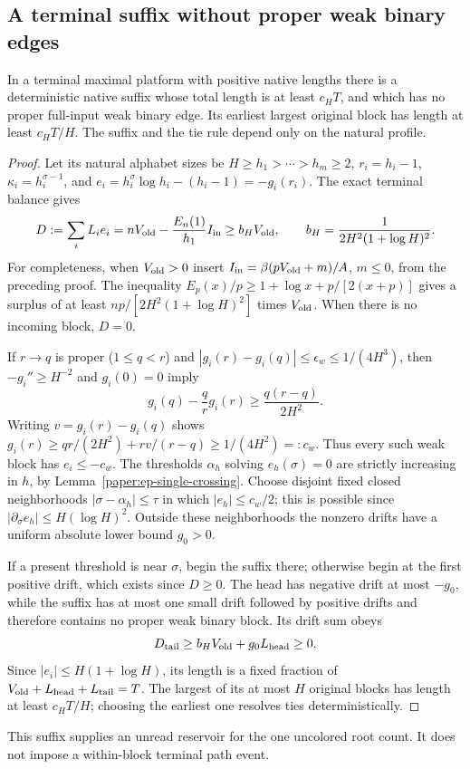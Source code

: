 \subsection{A terminal suffix without proper weak binary edges}
\label{paper:ep-terminal-suffix}
\begin{proposition}\label{paper:ep-binary-free}
In a terminal maximal platform with positive native lengths there is
a deterministic native suffix
whose total length is at least $c_HT$, and which has no proper
full-input weak binary edge.  Its earliest largest original block has
length at least $c_HT/H$.  The suffix and the tie rule depend only on
the natural profile.
\end{proposition}
\begin{proof}
Let its natural alphabet sizes be $H\geq h_1>\cdots>h_m\geq2$,
$r_i=h_i-1$, $\kappa_i=h_i^{\sigma-1}$, and
$e_i=h_i^\sigma\log h_i-(h_i-1)=-g_i(r_i)$.
The exact terminal balance gives
\[
 D:=\sum_iL_ie_i
 =nV_{\rm old}-\frac{E_n(1)}{h_1}I_{\rm in}
 \geq b_HV_{\rm old},\qquad
 b_H=\frac{1}{2H^2(1+\log H)^2}.
\]
For completeness, when $V_{\rm old}>0$ insert
$I_{\rm in}=\beta(pV_{\rm old}+m)/A$, $m\leq0$, from the
preceding proof.  The inequality
$E_p(x)/p\geq1+\log x+p/[2(x+p)]$ gives a surplus of at least
$np/[2H^2(1+\log H)^2]$ times $V_{\rm old}$.
When there is no incoming block, $D=0$.

If $r\to q$ is proper ($1\leq q<r$) and
$|g_i(r)-g_i(q)|\leq\epsilon_w\leq1/(4H^3)$, then
$-g_i''\geq H^{-2}$ and $g_i(0)=0$ imply
\[
 g_i(q)-\frac qrg_i(r)\geq\frac{q(r-q)}{2H^2}.
\]
Writing $v=g_i(r)-g_i(q)$ shows
$g_i(r)\geq qr/(2H^2)+rv/(r-q)\geq1/(4H^2)=:c_w$.
Thus every such weak block has $e_i\leq-c_w$.
The thresholds $\alpha_h$ solving $e_h(\sigma)=0$ are strictly
increasing in $h$, by Lemma~\ref{paper:ep-single-crossing}.
Choose disjoint fixed closed neighborhoods
$|\sigma-\alpha_h|\leq\tau$ in which $|e_h|\leq c_w/2$;
this is possible since $|\partial_\sigma e_h|\leq H(\log H)^2$.
Outside these neighborhoods the nonzero drifts have a uniform
absolute lower bound $g_0>0$.

If a present threshold is near $\sigma$, begin the suffix there;
otherwise begin at the first positive drift, which exists since
$D\geq0$.  The head has negative drift at most $-g_0$, while the
suffix has at most one small drift followed by positive drifts and
therefore contains no proper weak binary block.  Its drift sum obeys
\[
 D_{\rm tail}\geq b_HV_{\rm old}+g_0L_{\rm head}\geq0.
\]
Since $|e_i|\leq H(1+\log H)$, its length is a fixed fraction of
$V_{\rm old}+L_{\rm head}+L_{\rm tail}=T$.  The largest of its at
most $H$ original blocks has length at least $c_HT/H$; choosing the
earliest one resolves ties deterministically.
\end{proof}
This suffix supplies an unread reservoir for the one uncolored root
count.  It does not impose a within-block terminal path event.
